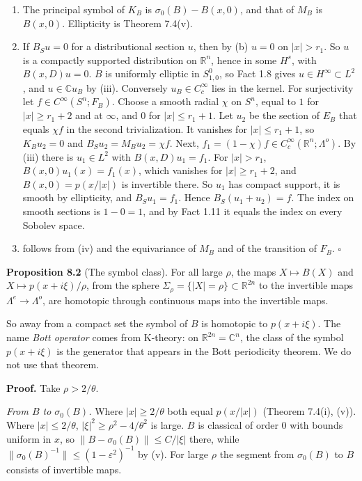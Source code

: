 \documentclass[
  11pt,
]{article}
\begin{document}
\begin{enumerate}
\def\labelenumi{(\alph{enumi})}
\setcounter{enumi}{2}
\item
  The principal symbol of \(K_B\) is \(\sigma_0(B)-B(x,0)\), and that of
  \(M_B\) is \(B(x,0)\). Ellipticity is Theorem 7.4(v).
\item
  If \(B_Su=0\) for a distributional section \(u\), then by (b) \(u=0\)
  on \(|x|>r_1\). So \(u\) is a compactly supported distribution on
  \(\mathbb R^n\), hence in some \(H^s\), with \(B(x,D)u=0\). \(B\) is
  uniformly elliptic in \(S^0_{1,0}\), so Fact 1.8 gives
  \(u\in H^\infty\subset L^2\), and \(u\in\mathbb Cu_B\) by (iii).
  Conversely \(u_B\in C_c^\infty\) lies in the kernel. For surjectivity
  let \(f\in C^\infty(S^n;F_B)\). Choose a smooth radial \(\chi\) on
  \(S^n\), equal to \(1\) for \(|x|\ge r_1+2\) and at \(\infty\), and
  \(0\) for \(|x|\le r_1+1\). Let \(u_2\) be the section of \(E_B\) that
  equals \(\chi f\) in the second trivialization. It vanishes for
  \(|x|\le r_1+1\), so \(K_Bu_2=0\) and \(B_Su_2=M_Bu_2=\chi f\). Next,
  \(f_1=(1-\chi)f\in C_c^\infty(\mathbb R^n;\Lambda^o)\). By (iii) there
  is \(u_1\in L^2\) with \(B(x,D)u_1=f_1\). For \(|x|>r_1\),
  \(B(x,0)u_1(x)=f_1(x)\), which vanishes for \(|x|\ge r_1+2\), and
  \(B(x,0)=p(x/|x|)\) is invertible there. So \(u_1\) has compact
  support, it is smooth by ellipticity, and \(B_Su_1=f_1\). Hence
  \(B_S(u_1+u_2)=f\). The index on smooth sections is \(1-0=1\), and by
  Fact 1.11 it equals the index on every Sobolev space.
\item
  follows from (iv) and the equivariance of \(M_B\) and of the
  transition of \(F_B\). \(\square\)
\end{enumerate}

\textbf{Proposition 8.2} (The symbol class). For all large \(\rho\), the
maps \(X\mapsto B(X)\) and \(X\mapsto p(x+i\xi)/\rho\), from the sphere
\(\Sigma_\rho=\{|X|=\rho\}\subset\mathbb R^{2n}\) to the invertible maps
\(\Lambda^e\to\Lambda^o\), are homotopic through continuous maps into
the invertible maps.

So away from a compact set the symbol of \(B\) is homotopic to
\(p(x+i\xi)\). The name \emph{Bott operator} comes from K-theory: on
\(\mathbb R^{2n}=\mathbb C^n\), the class of the symbol \(p(x+i\xi)\) is
the generator that appears in the Bott periodicity theorem. We do not
use that theorem.

\textbf{Proof.} Take \(\rho>2/\theta\).

\emph{From \(B\) to \(\sigma_0(B)\).} Where \(|x|\ge2/\theta\) both
equal \(p(x/|x|)\) (Theorem 7.4(i), (v)). Where \(|x|\le2/\theta\),
\(|\xi|^2\ge\rho^2-4/\theta^2\) is large. \(B\) is classical of order
\(0\) with bounds uniform in \(x\), so \(\|B-\sigma_0(B)\|\le C/|\xi|\)
there, while \(\|\sigma_0(B)^{-1}\|\le(1-\varepsilon^2)^{-1}\) by (v).
For large \(\rho\) the segment from \(\sigma_0(B)\) to \(B\) consists of
invertible maps.
\end{document}
